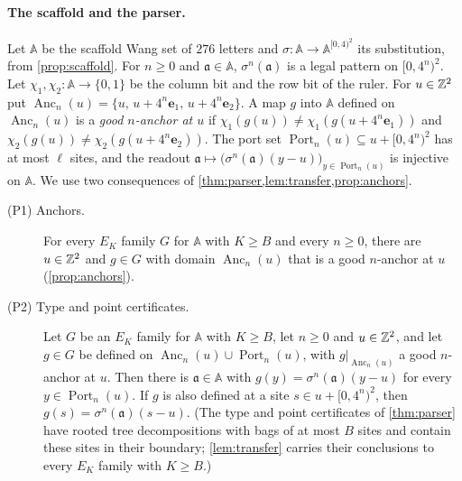\paragraph{The scaffold and the parser.} Let $\mathbb A$ be the scaffold Wang set of $276$ letters and $\sigma\colon\mathbb A\to\mathbb A^{[0,4)^2}$ its substitution, from \cref{prop:scaffold}. For $n\ge0$ and $\mathfrak a\in\mathbb A$, $\sigma^n(\mathfrak a)$ is a legal pattern on $[0,4^n)^2$. Let $\chi_1,\chi_2\colon\mathbb A\to\{0,1\}$ be the column bit and the row bit of the ruler. For $u\in\mathbb{Z}^2$ put $\operatorname{Anc}_n(u)=\{u,\,u+4^n\mathbf e_1,\,u+4^n\mathbf e_2\}$. A map $g$ into $\mathbb A$ defined on $\operatorname{Anc}_n(u)$ is a \emph{good $n$-anchor at $u$} if $\chi_1(g(u))\ne\chi_1(g(u+4^n\mathbf e_1))$ and $\chi_2(g(u))\ne\chi_2(g(u+4^n\mathbf e_2))$. The port set $\operatorname{Port}_n(u)\subseteq u+[0,4^n)^2$ has at most $\ell$ sites, and the readout $\mathfrak a\mapsto\bigl(\sigma^n(\mathfrak a)(y-u)\bigr)_{y\in\operatorname{Port}_n(u)}$ is injective on $\mathbb A$. We use two consequences of \cref{thm:parser,lem:transfer,prop:anchors}.
\begin{description}
\item[(P1) Anchors.] For every $E_K$ family $G$ for $\mathbb A$ with $K\ge B$ and every $n\ge0$, there are $u\in\mathbb{Z}^2$ and $g\in G$ with domain $\operatorname{Anc}_n(u)$ that is a good $n$-anchor at $u$ (\cref{prop:anchors}).
\item[(P2) Type and point certificates.] Let $G$ be an $E_K$ family for $\mathbb A$ with $K\ge B$, let $n\ge0$ and $u\in\mathbb{Z}^2$, and let $g\in G$ be defined on $\operatorname{Anc}_n(u)\cup\operatorname{Port}_n(u)$, with $g|_{\operatorname{Anc}_n(u)}$ a good $n$-anchor at $u$. Then there is $\mathfrak a\in\mathbb A$ with $g(y)=\sigma^n(\mathfrak a)(y-u)$ for every $y\in\operatorname{Port}_n(u)$. If $g$ is also defined at a site $s\in u+[0,4^n)^2$, then $g(s)=\sigma^n(\mathfrak a)(s-u)$. (The type and point certificates of \cref{thm:parser} have rooted tree decompositions with bags of at most $B$ sites and contain these sites in their boundary; \cref{lem:transfer} carries their conclusions to every $E_K$ family with $K\ge B$.)
\end{description}

